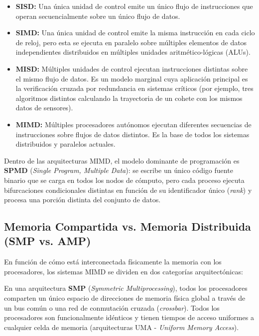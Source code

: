 \begin{itemize}[leftmargin=*]
    \item \textbf{SISD:} Una única unidad de control emite un único flujo de instrucciones que operan secuencialmente sobre un único flujo de datos.
    \item \textbf{SIMD:} Una única unidad de control emite la misma instrucción en cada ciclo de reloj, pero esta se ejecuta en paralelo sobre múltiples elementos de datos independientes distribuidos en múltiples unidades aritmético-lógicas (ALUs).
    \item \textbf{MISD:} Múltiples unidades de control ejecutan instrucciones distintas sobre el mismo flujo de datos. Es un modelo marginal cuya aplicación principal es la verificación cruzada por redundancia en sistemas críticos (por ejemplo, tres algoritmos distintos calculando la trayectoria de un cohete con los mismos datos de sensores).
    \item \textbf{MIMD:} Múltiples procesadores autónomos ejecutan diferentes secuencias de instrucciones sobre flujos de datos distintos. Es la base de todos los sistemas distribuidos y paralelos actuales.
\end{itemize}

\begin{aviso}
Dentro de las arquitecturas MIMD, el modelo dominante de programación es \textbf{SPMD} (\emph{Single Program, Multiple Data}): se escribe un único código fuente binario que se carga en todos los nodos de cómputo, pero cada proceso ejecuta bifurcaciones condicionales distintas en función de su identificador único (\emph{rank}) y procesa una porción distinta del conjunto de datos.
\end{aviso}

\subsection{Memoria Compartida vs. Memoria Distribuida (SMP vs. AMP)}
En función de cómo está interconectada físicamente la memoria con los procesadores, los sistemas MIMD se dividen en dos categorías arquitectónicas:

\begin{definicion}
En una arquitectura \textbf{SMP} (\emph{Symmetric Multiprocessing}), todos los procesadores comparten un único espacio de direcciones de memoria física global a través de un bus común o una red de conmutación cruzada (\emph{crossbar}). Todos los procesadores son funcionalmente idénticos y tienen tiempos de acceso uniformes a cualquier celda de memoria (arquitecturas UMA - \emph{Uniform Memory Access}).
\end{definicion}

